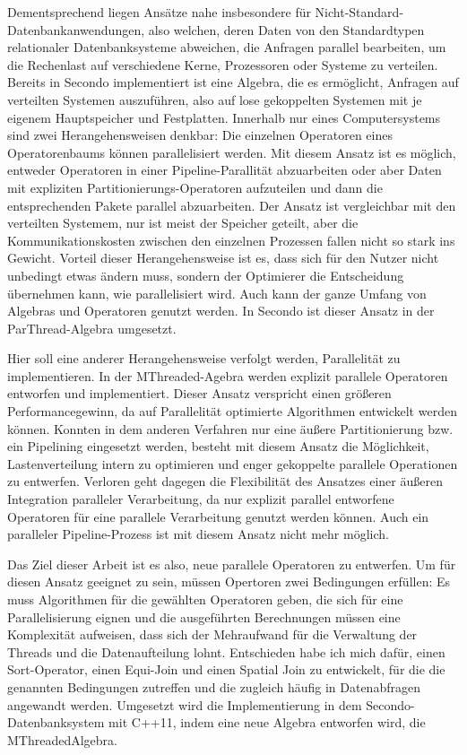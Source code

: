 \documentclass[a4paper,12pt,twoside]{article}
\begin{document}
Dementsprechend liegen Ansätze nahe insbesondere für Nicht-Standard-Datenbankanwendungen, also welchen, deren Daten von den Standardtypen relationaler Datenbanksysteme abweichen, die Anfragen parallel bearbeiten, um die Rechenlast auf verschiedene Kerne, Prozessoren oder Systeme zu verteilen. Bereits in Secondo implementiert ist eine Algebra, die es ermöglicht, Anfragen auf verteilten Systemen auszuführen, also auf lose gekoppelten Systemen mit je eigenem Hauptspeicher und Festplatten. Innerhalb nur eines Computersystems sind zwei Herangehensweisen denkbar: Die einzelnen Operatoren eines Operatorenbaums können parallelisiert werden. Mit diesem Ansatz ist es möglich, entweder Operatoren in einer Pipeline-Parallität abzuarbeiten oder aber Daten mit expliziten Partitionierungs-Operatoren aufzuteilen und dann die entsprechenden Pakete parallel abzuarbeiten. Der Ansatz ist vergleichbar mit den verteilten Systemem, nur ist meist der Speicher geteilt, aber die Kommunikationskosten zwischen den einzelnen Prozessen fallen nicht so stark ins Gewicht. Vorteil dieser Herangehensweise ist es, dass sich für den Nutzer nicht unbedingt etwas ändern muss, sondern der Optimierer die Entscheidung übernehmen kann, wie parallelisiert wird. Auch kann der ganze Umfang von Algebras und Operatoren genutzt werden. In Secondo ist dieser Ansatz in der ParThread-Algebra umgesetzt.
  
Hier soll eine anderer Herangehensweise verfolgt werden, Parallelität zu implementieren. In der MThreaded-Agebra werden explizit parallele Operatoren entworfen und implementiert. Dieser Ansatz verspricht einen größeren Performancegewinn, da auf Parallelität optimierte Algorithmen entwickelt werden können. Konnten in dem anderen Verfahren nur eine äußere Partitionierung bzw. ein Pipelining eingesetzt werden, besteht mit diesem Ansatz die Möglichkeit, Lastenverteilung intern zu optimieren und enger gekoppelte parallele Operationen zu entwerfen. Verloren geht dagegen die Flexibilität des Ansatzes einer äußeren Integration paralleler Verarbeitung, da nur explizit parallel entworfene Operatoren für eine parallele Verarbeitung genutzt werden können. Auch ein paralleler Pipeline-Prozess ist mit diesem Ansatz nicht mehr möglich.

Das Ziel dieser Arbeit ist es also, neue parallele Operatoren zu entwerfen. Um für diesen Ansatz geeignet zu sein, müssen Opertoren zwei Bedingungen erfüllen: Es muss Algorithmen für die gewählten Operatoren geben, die sich für eine Parallelisierung eignen und die ausgeführten Berechnungen müssen eine Komplexität aufweisen, dass sich der Mehraufwand für die Verwaltung der Threads und die Datenaufteilung lohnt. Entschieden habe ich mich dafür, einen Sort-Operator, einen Equi-Join und einen Spatial Join zu entwickelt, für die die genannten Bedingungen zutreffen und die zugleich häufig in Datenabfragen angewandt werden. Umgesetzt wird die Implementierung in dem Secondo-Datenbanksystem mit C++11, indem eine neue Algebra entworfen wird, die MThreadedAlgebra. 
\end{document}
